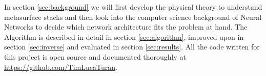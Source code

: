 \indent
In section \ref{sec:background} we will first develop the physical theory to understand metasurface stacks and then look into the computer science background of Neural Networks to decide which network architecture fits the problem at hand. The Algorithm is described in detail in section \ref{sec:algorithm}, improved upon in section \ref{sec:inverse} and evaluated in section \ref{sec:results}.
All the code written for this project is open source and documented thoroughly at \url{https://github.com/TimLucaTuran}.
